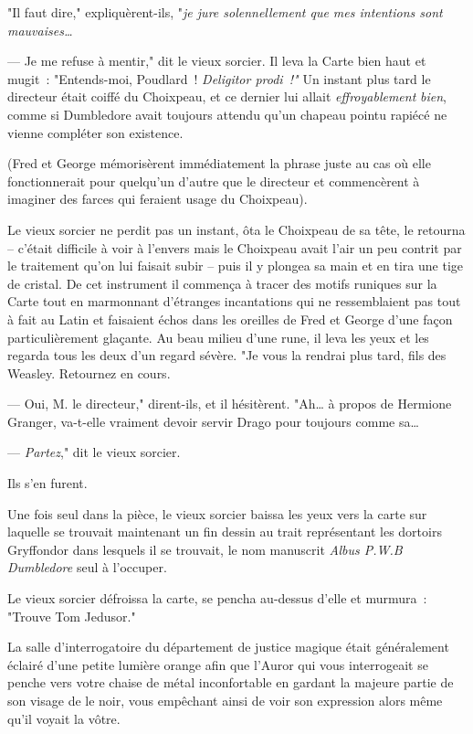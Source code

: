 "Il faut dire," expliquèrent-ils, "\emph{je jure solennellement que mes intentions sont mauvaises…}

--- Je me refuse à mentir," dit le vieux sorcier. Il leva la Carte bien haut et mugit~: "Entends-moi, Poudlard~! \emph{Deligitor prodi~!"} Un instant plus tard le directeur était coiffé du Choixpeau, et ce dernier lui allait \emph{effroyablement} \emph{bien}, comme si Dumbledore avait toujours attendu qu'un chapeau pointu rapiécé ne vienne compléter son existence.

(Fred et George mémorisèrent immédiatement la phrase juste au cas où elle fonctionnerait pour quelqu'un d'autre que le directeur et commencèrent à imaginer des farces qui feraient usage du Choixpeau).

Le vieux sorcier ne perdit pas un instant, ôta le Choixpeau de sa tête, le retourna -- c'était difficile à voir à l'envers mais le Choixpeau avait l'air un peu contrit par le traitement qu'on lui faisait subir -- puis il y plongea sa main et en tira une tige de cristal. De cet instrument il commença à tracer des motifs runiques sur la Carte tout en marmonnant d'étranges incantations qui ne ressemblaient pas tout à fait au Latin et faisaient échos dans les oreilles de Fred et George d'une façon particulièrement glaçante. Au beau milieu d'une rune, il leva les yeux et les regarda tous les deux d'un regard sévère. "Je vous la rendrai plus tard, fils des Weasley. Retournez en cours.

--- Oui, M. le directeur," dirent-ils, et il hésitèrent. "Ah… à propos de Hermione Granger, va-t-elle vraiment devoir servir Drago pour toujours comme sa…

--- \emph{Partez}," dit le vieux sorcier.

Ils s'en furent.

Une fois seul dans la pièce, le vieux sorcier baissa les yeux vers la carte sur laquelle se trouvait maintenant un fin dessin au trait représentant les dortoirs Gryffondor dans lesquels il se trouvait, le nom manuscrit \emph{Albus P.W.B Dumbledore} seul à l'occuper.

Le vieux sorcier défroissa la carte, se pencha au-dessus d'elle et murmura~: "Trouve Tom Jedusor."

\later

La salle d'interrogatoire du département de justice magique était généralement éclairé d'une petite lumière orange afin que l'Auror qui vous interrogeait se penche vers votre chaise de métal inconfortable en gardant la majeure partie de son visage de le noir, vous empêchant ainsi de voir son expression alors même qu'il voyait la vôtre.

